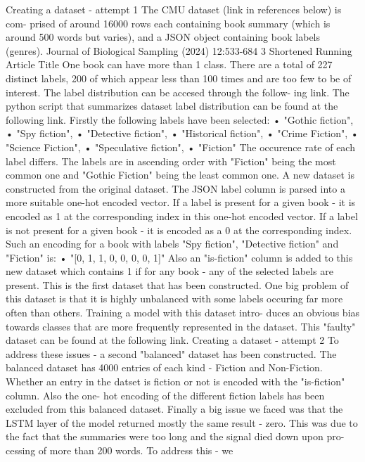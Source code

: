 Creating a dataset - attempt 1
The CMU dataset (link in references below) is com-
prised of around 16000 rows each containing book
summary (which is around 500 words but varies),
and a JSON object containing book labels (genres).
Journal of Biological Sampling (2024) 12:533-684 3
Shortened Running Article Title
One book can have more than 1 class. There are a
total of 227 distinct labels, 200 of which appear less
than 100 times and are too few to be of interest. The
label distribution can be accesed through the follow-
ing link. The python script that summarizes dataset
label distribution can be found at the following link.
Firstly the following labels have been selected:
• "Gothic fiction",
• "Spy fiction",
• "Detective fiction",
• "Historical fiction",
• "Crime Fiction",
• "Science Fiction",
• "Speculative fiction",
• "Fiction"
The occurence rate of each label differs. The labels
are in ascending order with "Fiction" being the most
common one and "Gothic Fiction" being the least
common one.
A new dataset is constructed from the original
dataset. The JSON label column is parsed into a
more suitable one-hot encoded vector. If a label is
present for a given book - it is encoded as 1 at the
corresponding index in this one-hot encoded vector.
If a label is not present for a given book - it is encoded
as a 0 at the corresponding index. Such an encoding
for a book with labels "Spy fiction", "Detective fiction"
and "Fiction" is:
• "[0, 1, 1, 0, 0, 0, 0, 1]"
Also an "is-fiction" column is added to this new
dataset which contains 1 if for any book - any of the
selected labels are present.
This is the first dataset that has been constructed.
One big problem of this dataset is that it is highly
unbalanced with some labels occuring far more often
than others. Training a model with this dataset intro-
duces an obvious bias towards classes that are more
frequently represented in the dataset. This "faulty"
dataset can be found at the following link.
Creating a dataset - attempt 2
To address these issues - a second "balanced" dataset
has been constructed. The balanced dataset has
4000 entries of each kind - Fiction and Non-Fiction.
Whether an entry in the datset is fiction or not is
encoded with the "is-fiction" column. Also the one-
hot encoding of the different fiction labels has been
excluded from this balanced dataset.
Finally a big issue we faced was that the LSTM
layer of the model returned mostly the same result
- zero. This was due to the fact that the summaries
were too long and the signal died down upon pro-
cessing of more than 200 words. To address this - we
